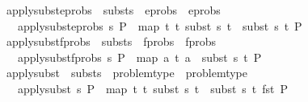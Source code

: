 \begin{isabellebody}
\isanewline
\isanewline
\isanewline
\isanewline
\isanewline
{}\isamarkupfalse%
\ apply{\isacharunderscore}{\kern0pt}subst{\isacharunderscore}{\kern0pt}eprobs\ {\isacharcolon}{\kern0pt}{\isacharcolon}{\kern0pt}\ {\isachardoublequoteopen}substs\ {\isasymRightarrow}\ eprobs\ {\isasymRightarrow}\ eprobs{\isachardoublequoteclose}\isanewline
\ \ \ {\isachardoublequoteopen}apply{\isacharunderscore}{\kern0pt}subst{\isacharunderscore}{\kern0pt}eprobs\ s\ P\ {\isasymequiv}\ map\ {\isacharparenleft}{\kern0pt}{\isasymlambda}{\isacharparenleft}{\kern0pt}t{}{\isacharcomma}{\kern0pt}\ t{}{\isacharparenright}{\kern0pt}{\isachardot}{\kern0pt}\ {\isacharparenleft}{\kern0pt}subst\ s\ t{}\ {\isasymapprox}{\isacharquery}{\kern0pt}\ subst\ s\ t{}{\isacharparenright}{\kern0pt}{\isacharparenright}{\kern0pt}\ P{\isachardoublequoteclose}\isanewline
\isanewline
{}\isamarkupfalse%
\ apply{\isacharunderscore}{\kern0pt}subst{\isacharunderscore}{\kern0pt}fprobs\ {\isacharcolon}{\kern0pt}{\isacharcolon}{\kern0pt}\ {\isachardoublequoteopen}substs\ {\isasymRightarrow}\ fprobs\ {\isasymRightarrow}\ fprobs{\isachardoublequoteclose}\isanewline
\ \ \ {\isachardoublequoteopen}apply{\isacharunderscore}{\kern0pt}subst{\isacharunderscore}{\kern0pt}fprobs\ s\ P\ {\isasymequiv}\ map\ {\isacharparenleft}{\kern0pt}{\isasymlambda}{\isacharparenleft}{\kern0pt}a{\isacharcomma}{\kern0pt}\ t{\isacharparenright}{\kern0pt}{\isachardot}{\kern0pt}\ {\isacharparenleft}{\kern0pt}a\ {\isasymsharp}{\isacharquery}{\kern0pt}\ subst\ s\ t{\isacharparenright}{\kern0pt}{\isacharparenright}{\kern0pt}\ P{\isachardoublequoteclose}\isanewline
\isanewline
\isanewline
{}\isamarkupfalse%
\ apply{\isacharunderscore}{\kern0pt}subst\ {\isacharcolon}{\kern0pt}{\isacharcolon}{\kern0pt}\ {\isachardoublequoteopen}substs\ {\isasymRightarrow}\ problem{\isacharunderscore}{\kern0pt}type\ {\isasymRightarrow}\ problem{\isacharunderscore}{\kern0pt}type{\isachardoublequoteclose}\isanewline
\ \ \ {\isachardoublequoteopen}apply{\isacharunderscore}{\kern0pt}subst\ s\ P\ {\isasymequiv}\ {\isacharparenleft}{\kern0pt}map\ {\isacharparenleft}{\kern0pt}{\isasymlambda}{\isacharparenleft}{\kern0pt}t{}{\isacharcomma}{\kern0pt}\ t{}{\isacharparenright}{\kern0pt}{\isachardot}{\kern0pt}\ {\isacharparenleft}{\kern0pt}subst\ s\ t{}\ {\isasymapprox}{\isacharquery}{\kern0pt}\ subst\ s\ t{}{\isacharparenright}{\kern0pt}{\isacharparenright}{\kern0pt}\ {\isacharparenleft}{\kern0pt}fst\ P{\isacharparenright}{\kern0pt}{\isacharcomma}{\kern0pt}\isanewline

\end{isabellebody}
